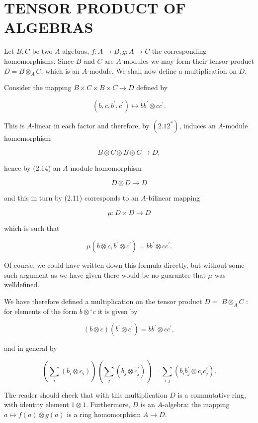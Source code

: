 \documentclass{standalone}
\theoremstyle{definition}
\theoremstyle{remark}
\begin{document}
\section{TENSOR PRODUCT OF ALGEBRAS}
Let $B, C$ be two $A$-algebras, $f: A \rightarrow B, g: A \rightarrow C$ the corresponding homomorphisms. Since $B$ and $C$ are $A$-modules we may form their tensor product $D=B \otimes_{A} C$, which is an $A$-module. We shall now define a multiplication on $D$.

Consider the mapping $B \times C \times B \times C \rightarrow D$ defined by

\[
\left(b, c, b^{\prime}, c^{\prime}\right) \mapsto b b^{\prime} \otimes c c^{\prime} .
\]

This is $A$-linear in each factor and therefore, by $\left(2.12^{*}\right)$, induces an $A$-module homomorphism

\[
B \otimes C \otimes B \otimes C \rightarrow D,
\]

hence by (2.14) an $A$-module homomorphism

\[
D \otimes D \rightarrow D
\]

and this in turn by (2.11) corresponds to an $A$-bilinear mapping

\[
\mu: D \times D \rightarrow D
\]

which is such that

\[
\mu\left(b \otimes c, b^{\prime} \otimes c^{\prime}\right)=b b^{\prime} \otimes c c^{\prime} .
\]

Of course, we could have written down this formula directly, but without some such argument as we have given there would be no guarantee that $\mu$ was welldefined.

We have therefore defined a multiplication on the tensor product $D=$ $B \otimes_{A} C$ : for elements of the form $b \otimes{ }^{\circ} c$ it is given by

\[
(b \otimes c)\left(b^{\prime} \otimes c^{\prime}\right)=b b^{\prime} \otimes c c^{\prime},
\]

and in general by

\[
\left(\sum_{i}\left(b_{i} \otimes c_{i}\right)\right)\left(\sum_{j}\left(b_{j}^{\prime} \otimes c_{j}^{\prime}\right)\right)=\sum_{i, j}\left(b_{i} b_{j}^{\prime} \otimes c_{i} c_{j}^{\prime}\right) .
\]

The reader should check that with this multiplication $D$ is a commutative ring, with identity element $1 \otimes 1$. Furthermore, $D$ is an $A$-algebra: the mapping $a \mapsto f(a) \otimes g(a)$ is a ring homomorphism $A \rightarrow D$.
\end{document}
